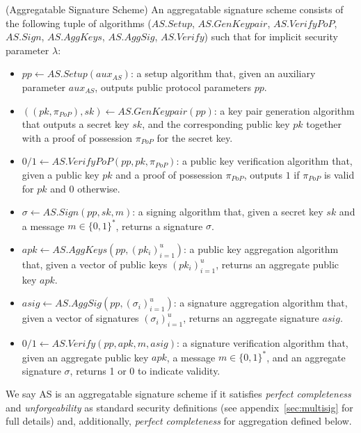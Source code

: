 \begin{definition}
\label{def:aggregate_signatures}
(Aggregatable Signature Scheme) An aggregatable signature scheme consists of
the following tuple of algorithms ($\mathit{AS.Setup}$, $\mathit{AS.GenKeypair}$, $\mathit{AS.VerifyPoP}$, 
$\mathit{AS.Sign}$, $\mathit{AS.AggKeys}$, $\mathit{AS.AggSig}$, $\mathit{AS.Verify}$) 
such that for implicit security parameter $\lambda$:
\vspace{-0.05in}
\begin{itemize}

\item $\mathit{pp} \leftarrow  \mathit{AS.Setup}(\mathit{aux_{\mathit{AS}}})$: a setup algorithm that, given an 
auxiliary parameter $\mathit{aux_{\mathit{AS}}}$, outputs public protocol parameters $\mathit{pp}$. 

\item $((\mathit{pk},\mathit{\pi_{PoP}}),\mathit{sk}) \leftarrow \mathit{AS.GenKeypair}(\mathit{pp})$:
a key pair generation algorithm that
outputs
a secret key $\mathit{sk}$,
and the corresponding public key $\mathit{pk}$
together with a proof of possession $\mathit{\pi_{PoP}}$ for the secret key.

\item $0/1 \leftarrow \mathit{AS.VerifyPoP}(\mathit{pp}, \mathit{pk},\mathit{\pi_{PoP}})$:
a public key verification algorithm that,
given a public key $\mathit{pk}$
and a proof of possession $\mathit{\pi_{PoP}}$,
outputs
$1$ if $\mathit{\pi_{PoP}}$ is valid for $\mathit{pk}$ and $0$ otherwise.

\item $\sigma \leftarrow \mathit{AS.Sign}(\mathit{pp}, \mathit{sk}, m)$:
a signing algorithm that,
given a secret key $\mathit{sk}$ and a message $m \in \{0, 1\}^*$, returns a signature $\sigma$.

\item $\mathit{apk} \leftarrow \mathit{AS.AggKeys}(\mathit{pp}, (\mathit{pk_i})_{i=1}^{u})$:
a public key aggregation algorithm that,
given a vector of public keys $(\mathit{pk_i})_{i=1}^u$,
returns
an aggregate public key $\mathit{apk}$.

\item $\mathit{asig} \leftarrow \mathit{AS.AggSig}(\mathit{pp}, (\sigma_i)_{i=1}^u)$:
a signature aggregation algorithm that,
given a vector of signatures $(\sigma_i)_{i=1}^u$,
returns
an aggregate signature $\mathit{asig}$.

\item $0/1 \leftarrow \mathit{AS.Verify}(\mathit{pp}, \mathit{apk}, m, \mathit{asig})$:
a signature verification algorithm that,
given an aggregate public key $\mathit{apk}$, a message $m \in \{0, 1\}^*$, and an aggregate signature $\sigma$,
returns
1 or 0 to indicate validity.
\end{itemize}
\vspace{-0.07in}
\noindent We say AS is an aggregatable signature scheme if it satisfies \emph{perfect completeness} and \emph{unforgeability} 
as standard security definitions (see appendix~\ref{sec:multisig} for full details) 
and, additionally, \emph{perfect completeness} for aggregation defined below.
\end{definition}

